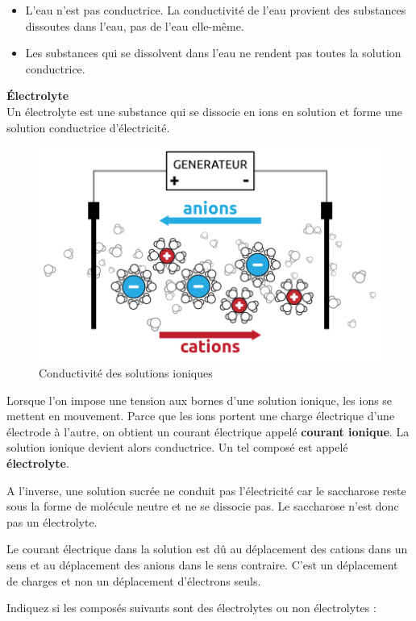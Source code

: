 \documentclass[
  11pt,
  french,
  a4paper,
  openany]{book}
\providecommand{\tightlist}{%
  \setlength{\itemsep}{0pt}\setlength{\parskip}{0pt}}
\begin{document}
\begin{itemize}
\tightlist
\item
  L'eau n'est pas conductrice. La conductivité de l'eau provient des substances dissoutes dans l'eau, pas de l'eau elle-même.
\item
  Les substances qui se dissolvent dans l'eau ne rendent pas toutes la solution conductrice.
\end{itemize}

\begin{tcolorbox}
\textbf{Électrolyte}\\
Un électrolyte est une substance qui se dissocie en ions en solution et forme une solution conductrice d'électricité.

\end{tcolorbox}

\begin{figure}

{\centering \includegraphics[width=0.5\linewidth]{images/electrolyte-2b} 

}

\caption{Conductivité des solutions ioniques}\label{fig:electrolyte-2b}
\end{figure}

Lorsque l'on impose une tension aux bornes d'une solution ionique, les ions se mettent en mouvement. Parce que les ions portent une charge électrique d'une électrode à l'autre, on obtient un courant électrique appelé \textbf{courant ionique}. La solution ionique devient alors conductrice. Un tel composé est appelé \textbf{électrolyte}.

A l'inverse, une solution sucrée ne conduit pas l'électricité car le saccharose reste sous la forme de molécule neutre et ne se dissocie pas. Le saccharose n'est donc pas un électrolyte.

Le courant électrique dans la solution est dû au déplacement des cations dans un sens et au déplacement des anions dans le sens contraire. C'est un déplacement de charges et non un déplacement d'électrons seuls.

\begin{Exercise}
Indiquez si les composés suivants sont des électrolytes ou non électrolytes :

\end{Exercise}
\end{document}
